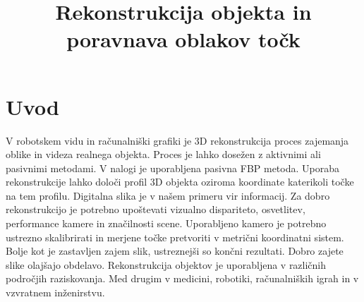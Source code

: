 \documentclass[journal,a4paper,twoside]{sty/IEEEtran}
\begin{document}
\title{Rekonstrukcija objekta in poravnava oblakov točk}


\address{Univerza v Ljubljani, Fakulteta za elektrotehniko, Tržaška 25, 1000 Ljubljana, Slovenija\\
E-pošta: janez.lapajne@gmail.com, knap.martin@gmail.com}






\maketitle


\section{Uvod}
V robotskem vidu in računalniški grafiki je 3D rekonstrukcija proces zajemanja oblike in videza realnega objekta. Proces je lahko dosežen z aktivnimi ali pasivnimi metodami. V nalogi je uporabljena pasivna FBP metoda. Uporaba rekonstrukcije lahko določi profil 3D objekta oziroma koordinate katerikoli točke na tem profilu. Digitalna slika je v našem primeru vir informacij. Za dobro rekonstrukcijo je potrebno upoštevati vizualno dispariteto, osvetlitev, performance kamere in značilnosti scene. Uporabljeno kamero je potrebno ustrezno skalibrirati in merjene točke pretvoriti v metrični koordinatni sistem. Bolje kot je zastavljen zajem slik, ustreznejši so končni rezultati. Dobro zajete slike olajšajo obdelavo. Rekonstrukcija objektov je uporabljena v različnih področjih raziskovanja. Med drugim v medicini, robotiki, računalniških igrah in v vzvratnem inženirstvu. 
\end{document}
